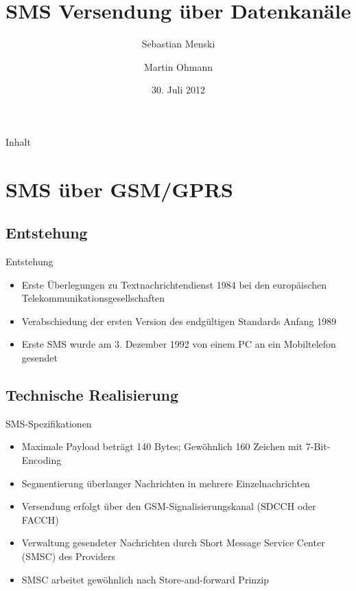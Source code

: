 \documentclass{beamer}
\title[SMS Versendung über Datenkanäle]{SMS Versendung über Datenkanäle}
\author{Sebastian Menski \and Martin Ohmann}
\institute{Institut für Informatik -- Universität Potsdam}
\date{30. Juli 2012}
\begin{document}
\begin{frame}
\titlepage
\end{frame}


\begin{frame}{Inhalt}
\tableofcontents
\end{frame}

\section{SMS über GSM/GPRS} %

\subsection{Entstehung}
\begin{frame}{Entstehung}
	\begin{itemize}
		\item Erste Überlegungen zu Textnachrichtendienst 1984 bei den 
			europäischen Telekommunikationsgesellschaften
		\item Verabschiedung der ersten Version des endgültigen Standards 
			Anfang 1989
		\item Erste SMS wurde am 3. Dezember 1992 von einem PC an ein 
			Mobiltelefon gesendet
	\end{itemize}
\end{frame}

\subsection{Technische Realisierung}
\begin{frame}{SMS-Spezifikationen}
	\begin{itemize}
		\item Maximale Payload beträgt 140 Bytes; Gewöhnlich 160 Zeichen mit 
			7-Bit-Encoding
		\item Segmentierung überlanger Nachrichten in mehrere Einzelnachrichten
		\item Versendung erfolgt über den GSM-Signalisierungskanal (SDCCH oder FACCH)
		\item Verwaltung gesendeter Nachrichten durch Short Message Service 
			Center (SMSC) des Providers
		\item SMSC arbeitet gewöhnlich nach Store-and-forward Prinzip
	\end{itemize}
\end{frame}
\end{document}
